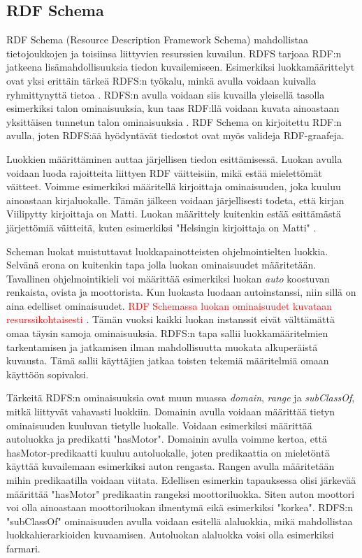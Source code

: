 \documentclass[finnish, 12pt, a4paper, elec, utf8, pdfa, online]{aaltothesis}
\begin{document}
\subsection{RDF Schema}
RDF Schema (Resource Description Framework Schema) mahdollistaa tietojoukkojen ja toisiinsa liittyvien resurssien kuvailun. RDFS tarjoaa RDF:n jatkeena lisämahdollisuuksia tiedon kuvailemiseen. Esimerkiksi luokkamäärittelyt ovat yksi erittäin tärkeä RDFS:n työkalu, minkä avulla voidaan kuivalla ryhmittynyttä tietoa \cite{W3C_RDFS2}. RDFS:n avulla voidaan siis kuvailla yleisellä tasolla esimerkiksi talon ominaisuuksia, kun taas RDF:llä voidaan kuvata ainoastaan yksittäisen tunnetun talon ominaisuuksia \cite{Antoniou}. RDF Schema on kirjoitettu RDF:n avulla, joten RDFS:ää hyödyntävät tiedostot ovat myös valideja RDF-graafeja. \cite{RDF_specification_old}

Luokkien määrittäminen auttaa järjellisen tiedon esittämisessä. Luokan avulla voidaan luoda rajoitteita liittyen RDF väitteisiin, mikä estää mielettömät väitteet. Voimme esimerkiksi määritellä kirjoittaja ominaisuuden, joka kuuluu ainoastaan kirjaluokalle. Tämän jälkeen voidaan järjellisesti todeta, että kirjan Viilipytty kirjoittaja on Matti. Luokan määrittely kuitenkin estää esittämästä järjettömiä väitteitä, kuten esimerkiksi "Helsingin kirjoittaja on Matti" \cite{Antoniou}.

Scheman luokat muistuttavat luokkapainotteisten ohjelmointielten luokkia. Selvänä erona on kuitenkin tapa jolla luokan ominaisuudet määritetään. Tavallinen ohjelmointikieli voi määrittää esimerkiksi luokan \textit{auto} koostuvan renkaista, ovista ja moottorista. Kun luokasta luodaan autoinstanssi, niin sillä on aina edelliset ominaisuudet. \textcolor{red} {RDF Schemassa luokan ominaisuudet kuvataan resurssikohtaisesti} \cite{W3C_RDFS2}. Tämän vuoksi kaikki luokan instanssit eivät välttämättä omaa täysin samoja ominaisuuksia. RDFS:n tapa sallii luokkamääritelmien tarkentamisen ja jatkamisen ilman mahdollisuutta muokata alkuperäistä kuvausta. Tämä sallii käyttäjien jatkaa toisten tekemiä määritelmiä omaan käyttöön sopivaksi.

Tärkeitä RDFS:n ominaisuuksia ovat muun muassa \textit{domain}, \textit{range} ja \textit{subClassOf}, mitkä liittyvät vahavasti luokkiin. Domainin avulla voidaan määrittää tietyn ominaisuuden kuuluvan tietylle luokalle. Voidaan esimerkiksi määrittää autoluokka ja predikatti "hasMotor". Domainin avulla voimme kertoa, että hasMotor-predikaatti kuuluu autoluokalle, joten predikaattia on mieletöntä käyttää kuvailemaan esimerkiksi auton rengasta. Rangen avulla määritetään mihin predikaatilla voidaan viitata. Edellisen esimerkin tapauksessa olisi järkevää määrittää "hasMotor" predikaatin rangeksi moottoriluokka. Siten auton moottori voi olla ainoastaan moottoriluokan ilmentymä eikä esimerkiksi "korkea". RDFS:n "subClassOf" ominaisuuden avulla voidaan esitellä alaluokkia, mikä mahdollistaa luokkahierarkioiden kuvaamisen. Autoluokan alaluokka voisi olla esimerkiksi farmari.
\end{document}
